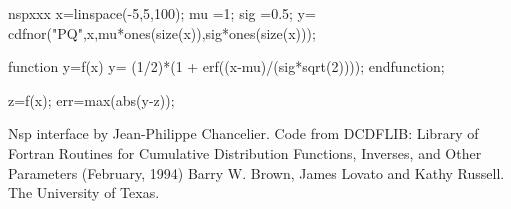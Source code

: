 \begin{mintednsp}{nspxxx}
x=linspace(-5,5,100);
mu =1;
sig =0.5;
y= cdfnor("PQ",x,mu*ones(size(x)),sig*ones(size(x)));

function y=f(x)
  y= (1/2)*(1 + erf((x-mu)/(sig*sqrt(2))));
endfunction;

z=f(x);
err=max(abs(y-z));
\end{mintednsp}

\begin{authors}
  Nsp interface by Jean-Philippe Chancelier. Code from DCDFLIB: 
  Library of Fortran Routines for Cumulative Distribution
  Functions, Inverses, and Other Parameters (February, 1994)
  Barry W. Brown, James Lovato and Kathy Russell. The University of Texas.
\end{authors}
